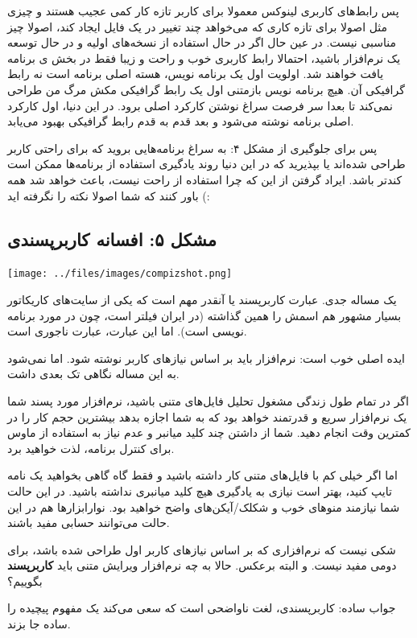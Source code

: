 پس رابط‌های کاربری لینوکس معمولا برای کاربر تازه کار کمی عجیب هستند و چیزی مثل 
اصولا برای تازه کاری که می‌خواهد چند تغییر در یک فایل ایجاد کند، اصولا چیز مناسبی نیست. در عین حال اگر در حال استفاده از نسخه‌های اولیه و در حال توسعه یک نرم‌افزار باشید، احتمالا رابط کاربری خوب و راحت و زیبا فقط در بخش 
ی برنامه یافت خواهند شد. اولویت اول یک برنامه نویس، هسته اصلی برنامه است نه رابط گرافیکی آن. هیچ برنامه نویس بازمتنی اول یک رابط گرافیکی مکش مرگ من طراحی نمی‌کند تا بعدا سر فرصت سراغ نوشتن کارکرد اصلی برود. در این دنیا، اول کارکرد اصلی برنامه نوشته می‌شود و بعد قدم به قدم رابط گرافیکی بهبود می‌یابد.

پس برای جلوگیری از مشکل ۴: به سراغ برنامه‌هایی بروید که برای راحتی کاربر طراحی شده‌اند یا بپذیرید که در این دنیا روند یادگیری استفاده از برنامه‌ها ممکن است کندتر باشد. ایراد گرفتن از این که چرا استفاده از 
راحت نیست، باعث خواهد شد همه باور کنند که شما اصولا نکته را نگرفته اید (:
\subsection*{مشکل ۵: افسانه کاربرپسندی}

\texttt{[image: ../files/images/compizshot.png]}

یک مساله جدی. عبارت کاربرپسند یا 
 آنقدر مهم است که یکی از سایت‌های کاریکاتور بسیار مشهور هم اسمش را همین گذاشته (در ایران فیلتر است، چون در مورد برنامه نویسی است). اما این عبارت، عبارت ناجوری است.

ایده اصلی خوب است: نرم‌افزار باید بر اساس نیازهای کاربر نوشته شود. اما نمی‌شود به این مساله نگاهی تک بعدی داشت.

اگر در تمام طول زندگی‌ مشغول تحلیل فایل‌های متنی باشید، نرم‌افزار مورد پسند شما یک نرم‌افزار سریع و قدرتمند خواهد بود که به شما اجازه بدهد بیشترین حجم کار را در کمترین وقت انجام دهید. شما از داشتن چند کلید میانبر و عدم نیاز به استفاده از ماوس برای کنترل برنامه، لذت خواهید برد.

اما اگر خیلی کم با فایل‌های متنی کار داشته باشید و فقط گاه گاهی بخواهید یک نامه تایپ کنید، بهتر است نیازی به یادگیری هیچ کلید میانبری نداشته باشید. در این حالت شما نیازمند منوهای خوب و شکلک/آیکن‌های واضح خواهید بود. نوارابزارها هم در این حالت می‌توانند حسابی مفید باشند.

شکی نیست که نرم‌افزاری که بر اساس نیازهای کاربر اول طراحی شده باشد، برای دومی مفید نیست. و البته برعکس. حالا به چه نرم‌افزار ویرایش متنی باید
\textbf{کاربرپسند}
بگوییم؟

جواب ساده: کاربرپسندی، لغت ناواضحی است که سعی می‌کند یک مفهوم پیچیده را ساده جا بزند.

